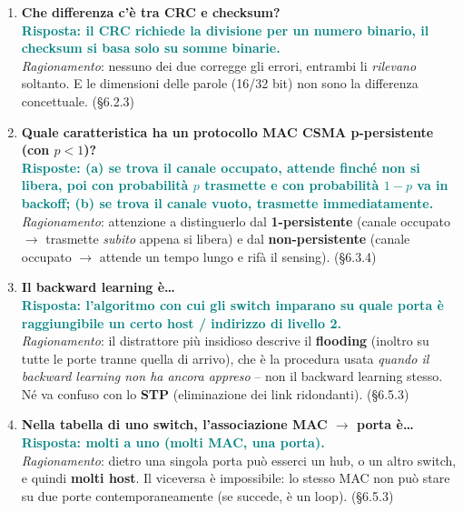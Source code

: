 \documentclass[12pt, a4paper]{article}
\begin{document}
\begin{enumerate}[leftmargin=*, resume]

\item \textbf{Che differenza c'è tra CRC e checksum?}\\
\textcolor{teal}{\textbf{Risposta: il CRC richiede la divisione per un numero binario, il checksum si basa solo su somme binarie.}}\\
\textit{Ragionamento}: \textcolor{red!70!black}{nessuno dei due corregge} gli errori, entrambi li \emph{rilevano} soltanto. E le dimensioni delle parole (16/32 bit) non sono la differenza concettuale. (\S6.2.3)

\item \textbf{Quale caratteristica ha un protocollo MAC CSMA p-persistente (con $p<1$)?}\\
\textcolor{teal}{\textbf{Risposte: (a) se trova il canale occupato, attende finché non si libera, poi con probabilità $p$ trasmette e con probabilità $1-p$ va in backoff; (b) se trova il canale vuoto, trasmette immediatamente.}}\\
\textit{Ragionamento}: attenzione a distinguerlo dal \textbf{1-persistente} (canale occupato $\to$ trasmette \emph{subito} appena si libera) e dal \textbf{non-persistente} (canale occupato $\to$ attende un tempo lungo e rifà il sensing). (\S6.3.4)

\item \textbf{Il backward learning è\dots}\\
\textcolor{teal}{\textbf{Risposta: l'algoritmo con cui gli switch imparano su quale porta è raggiungibile un certo host / indirizzo di livello 2.}}\\
\textit{Ragionamento}: il distrattore più insidioso descrive il \textbf{flooding} (inoltro su tutte le porte tranne quella di arrivo), che è la procedura usata \emph{quando il backward learning non ha ancora appreso} -- non il backward learning stesso. Né va confuso con lo \textbf{STP} (eliminazione dei link ridondanti). (\S6.5.3)

\item \textbf{Nella tabella di uno switch, l'associazione MAC $\to$ porta è\dots}\\
\textcolor{teal}{\textbf{Risposta: molti a uno (molti MAC, una porta).}}\\
\textit{Ragionamento}: dietro una singola porta può esserci un hub, o un altro switch, e quindi \textbf{molti host}. Il viceversa è impossibile: lo stesso MAC non può stare su due porte contemporaneamente (se succede, è un loop). (\S6.5.3)


\end{enumerate}
\end{document}
